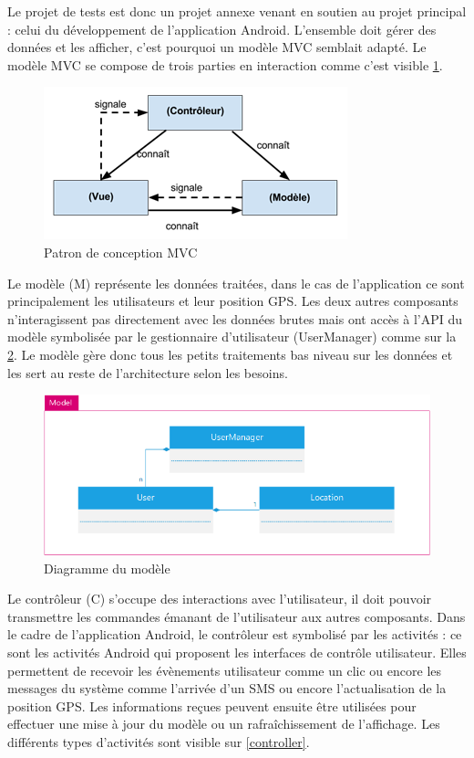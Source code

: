         Le projet de tests est donc un projet annexe venant en soutien au projet principal : celui du développement de l’application Android. L’ensemble doit gérer des données et les afficher, c’est pourquoi un modèle MVC semblait adapté. Le modèle MVC se compose de trois parties en interaction comme c’est visible \ref{mvc}. 

        \begin{figure}[H]
            \centering
            \includegraphics{./img/mvc.png}
            \caption{Patron de conception MVC}
            \label{mvc}
        \end{figure}

        Le modèle (M) représente les données traitées, dans le cas de l’application ce sont principalement les utilisateurs et leur position GPS. Les deux autres composants n’interagissent pas directement avec les données brutes mais ont accès à l’API du modèle symbolisée par le gestionnaire d’utilisateur (UserManager) comme sur la \ref{model}. Le modèle gère donc tous les petits traitements bas niveau sur les données et les sert au reste de l’architecture selon les besoins.

        \begin{figure}[H]
            \centering
            \includegraphics{./img/android-model.png}
            \caption{Diagramme du modèle}
            \label{model}
        \end{figure}

        Le contrôleur (C) s’occupe des interactions avec l’utilisateur, il doit pouvoir transmettre les commandes émanant de l’utilisateur aux autres composants. Dans le cadre de l’application Android, le contrôleur est symbolisé par les activités : ce sont les activités Android qui proposent les interfaces de contrôle utilisateur. Elles permettent de recevoir les évènements utilisateur comme un clic ou encore les messages du système comme l’arrivée d’un SMS ou encore l’actualisation de la position GPS. Les informations reçues peuvent ensuite être utilisées pour effectuer une mise à jour du modèle ou un rafraîchissement de l’affichage. Les différents types d’activités sont visible sur \ref{controller}.

